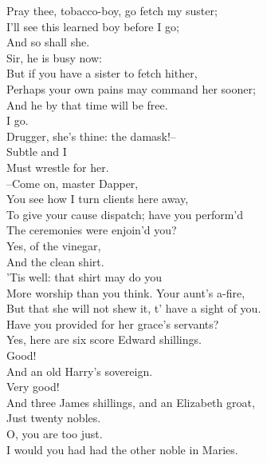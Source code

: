 \documentclass{memoir}
\begin{document}
\begin{drama*}
\kastrilspeaks  Pray thee, tobacco-boy, go fetch my suster;\\
 I'll see this learned boy before I go;\\
 And so shall she.\\
\facespeaks {} Sir, he is busy now:\\
 But if you have a sister to fetch hither,\\
 Perhaps your own pains may command her sooner;\\
 And he by that time will be free.\\
\kastrilspeaks {} I go.\\
\facespeaks  Drugger, she's thine: the damask!--\\
 Subtle and I\\
 Must wrestle for her.\\
 --Come on, master Dapper,\\
 You see how I turn clients here away,\\
 To give your cause dispatch; have you perform'd\\
 The ceremonies were enjoin'd you?\\
\dapperspeaks {} Yes, of the vinegar,\\
 And the clean shirt.\\
\facespeaks {} 'Tis well: that shirt may do you\\
 More worship than you think. Your aunt's a-fire,\\
 But that she will not shew it, t' have a sight of you.\\
 Have you provided for her grace's servants?\\
\dapperspeaks  Yes, here are six score Edward shillings.\\
\facespeaks {} Good!\\
\dapperspeaks  And an old Harry's sovereign.\\
\facespeaks {} Very good!\\
\dapperspeaks  And three James shillings, and an Elizabeth groat,\\
 Just twenty nobles.\\
\facespeaks {} O, you are too just.\\
 I would you had had the other noble in Maries.\\

\end{drama*}
\end{document}
